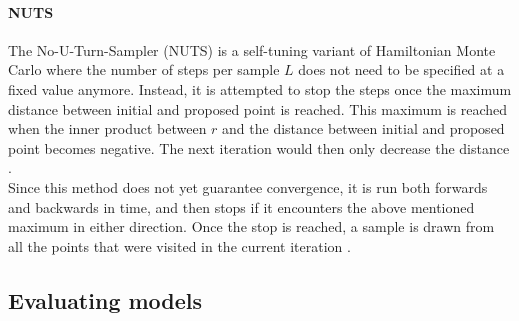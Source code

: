 \documentclass{article}
\begin{document}
\paragraph{NUTS}
The No-U-Turn-Sampler (NUTS) is a self-tuning variant of Hamiltonian Monte Carlo where the number of steps per sample $L$ does not need to be specified at a fixed value anymore. Instead,
it is attempted to stop the steps once the maximum distance between initial and proposed point is reached. This maximum is reached when the inner product between $r$ and the distance between initial and proposed point becomes negative. The next iteration would then only decrease the distance  \cite{1439840954}.
\\
Since this method does not yet guarantee convergence, it is run both forwards and backwards in time, and then stops if it encounters the above mentioned maximum in either direction.
Once the stop is reached, a sample is drawn from all the points that were visited in the current iteration \cite{hoffman2014no}.



\subsection{Evaluating models}
\end{document}
